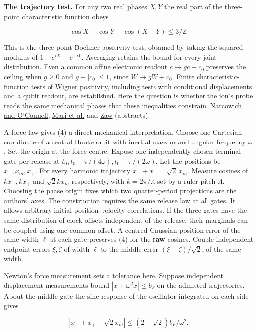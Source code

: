 \documentclass[11pt,a4paper]{article}
\begin{document}
\textbf{The trajectory test.} For any two real phases \(X,Y\) the real
part of the three-point characteristic function obeys

\[
 \cos X+\cos Y-\cos(X+Y)\le 3/2 .                              \tag{4}
\]

This is the three-point Bochner positivity test, obtained by taking the
squared modulus of \(1-e^{iX}-e^{-iY}\). Averaging retains the bound for
every joint distribution. Even a common affine electronic readout
\(c\mapsto g c+c_0\) preserves the ceiling when \(g\ge0\) and
\(g+|c_0|\le1\), since \(W\mapsto gW+c_0\). Finite
characteristic-function tests of Wigner positivity, including tests with
conditional displacements and a qubit readout, are established. Here the
question is whether the ion's probe reads the same mechanical phases
that these inequalities constrain.
\href{https://doi.org/10.1103/PhysRevA.34.1}{Narcowich and O'Connell},
\href{https://doi.org/10.1103/PhysRevLett.106.010403}{Mari et al.} and
\href{https://doi.org/10.1103/PhysRevLett.133.050201}{Zaw} (abstracts).

A force law gives (4) a direct mechanical interpretation. Choose one
Cartesian coordinate of a central Hooke orbit with inertial mass \(m\)
and angular frequency \(\omega\). Set the origin at the force centre.
Expose one independently chosen terminal gate per release at
\(t_0,t_0+\pi/(4\omega),t_0+\pi/(2\omega)\). Let the positions be
\(x_-,x_m,x_+\). For every harmonic trajectory
\(x_-+x_+=\sqrt{2}\,x_m\). Measure cosines of \(kx_-,kx_+\) and
\(\sqrt{2}kx_m\) respectively, with \(k=2\pi/\Lambda\) set by a ruler
pitch \(\Lambda\). Choosing the phase origin fixes which two
quarter-period projections are the authors' axes. The construction
requires the same release law at all gates. It allows arbitrary initial
position--velocity correlations. If the three gates have the same
distribution of clock offsets independent of the release, their
marginals can be coupled using one common offset. A centred Gaussian
position error of the same width \(\ell\) at each gate preserves (4) for
the \textbf{raw} cosines. Couple independent endpoint errors
\(\xi,\zeta\) of width \(\ell\) to the middle error
\((\xi+\zeta)/\sqrt{2}\), of the same width.

Newton's force measurement sets a tolerance here. Suppose independent
displacement measurements bound \(|\ddot x+\omega^2 x|\le b_F\) on the
admitted trajectories. About the middle gate the sine response of the
oscillator integrated on each side gives

\[
 |x_-+x_+-\sqrt{2}x_m|\le (2-\sqrt{2})b_F/\omega^2 .
\]
\end{document}
